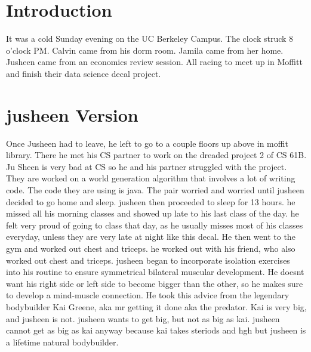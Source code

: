 \documentclass{article}
\begin{document}
\section{Introduction}
It was a cold Sunday evening on the UC Berkeley Campus. The clock struck 8 o'clock PM. Calvin came from his dorm room. Jamila came from her home. Jusheen came from an economics review session. All racing to meet up in Moffitt and finish their data science decal project.

\section{jusheen Version}

Once Jusheen had to leave, he left to go to a couple floors up above in moffit library. There he met his CS partner to work on the dreaded project 2 of CS 61B. Ju Sheen is very bad at CS so he and his partner struggled with the project. They are worked on a world generation algorithm that involves a lot of writing code. The code they are using is java.
The pair worried and worried until jusheen decided to go home and sleep. jusheen then proceeded to sleep for 13 hours. he missed all his morning classes and showed up late to his last class of the day. he felt very proud of going to class that day, as he usually misses most of his classes everyday, unless they are very late at night like this decal.
He then went to the gym and worked out chest and triceps. he worked out with his friend, who also worked out chest and triceps. jusheen began to incorporate isolation exercises into his routine to ensure symmetrical bilateral muscular development. He doesnt want his right side or left side to become bigger than the other, so he makes sure to develop
a mind-muscle connection. He took this advice from the legendary bodybuilder Kai Greene, aka mr getting it done aka the predator. Kai is very big, and jusheen is not. jusheen wants to get big, but not as big as kai. jusheen cannot get as big as kai anyway because kai takes steriods and hgh but jusheen is a lifetime natural bodybuilder.
\end{document}
